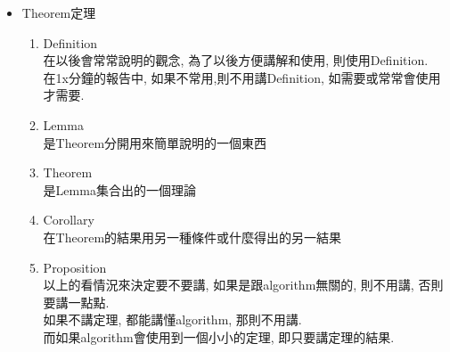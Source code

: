 \begin{enumerate}
{\begin{itemize}
{\begin{enumerate}
          \item
          {
            $ REL = A + B + C $\\
            只要講$REL$在算什麼就行了\\
            (除非別人不懂在講要算什麼, 才要把A, B, C都講出來大約算什麼則行了)
          } %
        \end{enumerate}
      } %

      \item
      {
        Theorem定理
        \begin{enumerate}
          \item
          {
            Definition\\
            在以後會常常說明的觀念, 為了以後方便講解和使用, 則使用Definition.\\
            在1x分鐘的報告中, 如果不常用,則不用講Definition, 如需要或常常會使用才需要.\\
          } %

          \item
          {
            Lemma\\
            是Theorem分開用來簡單說明的一個東西
          } %

          \item
          {
            Theorem\\
            是Lemma集合出的一個理論
          } %

          \item
          {
            Corollary\\
            在Theorem的結果用另一種條件或什麼得出的另一結果
          } %

          \item
          {
            Proposition\\
            以上的看情況來決定要不要講, 如果是跟algorithm無關的, 則不用講, 否則要講一點點.\\

            如果不講定理, 都能講懂algorithm, 那則不用講.\\
            而如果algorithm會使用到一個小小的定理, 即只要講定理的結果.
          } %


\end{enumerate}}
\end{itemize}}
\end{enumerate}
